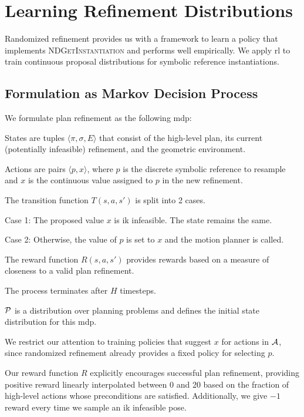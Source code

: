 \section{Learning Refinement Distributions}
Randomized refinement provides us with a framework to learn a policy that implements
\textsc{NDGetInstantiation} and performs well empirically. We apply {\sc rl}
to train continuous proposal distributions for symbolic reference instantiations.

\subsection{Formulation as Markov Decision Process}
We formulate plan refinement as the following {\sc mdp}:
\begin{tightlist}
\item States are tuples $\langle \pi, \sigma, E \rangle$ that consist of the
high-level plan, its current (potentially infeasible) refinement, and the
geometric environment.
\item Actions are pairs $\langle p, x \rangle$, where $p$ is the discrete symbolic
reference to resample and $x$ is the continuous value assigned to $p$ in the new refinement.
\item The transition function $T(s, a, s')$ is split into 2 cases.
  \begin{tightlist}
  \item Case 1: The proposed value $x$ is {\sc ik} infeasible. The state remains the same.
  \item Case 2: Otherwise, the value of $p$ is set to $x$ and the motion planner is called.
  \end{tightlist}
\item The reward function $R(s, a, s')$ provides rewards based on a measure of closeness to a valid plan refinement.
\item The process terminates after $H$ timesteps.
\item $\mathcal{P}$ is a distribution over planning problems and defines the initial state distribution for this {\sc mdp}.
\end{tightlist}

We restrict our attention to training policies that suggest $x$ for actions in $\mathcal{A}$, since
randomized refinement already provides a fixed policy for selecting $p$.

Our reward function $R$ explicitly encourages successful plan refinement, providing positive reward linearly
interpolated between 0 and 20 based on the fraction of high-level actions whose preconditions are
satisfied. Additionally, we give $-1$ reward every time we sample an {\sc ik} infeasible pose.

